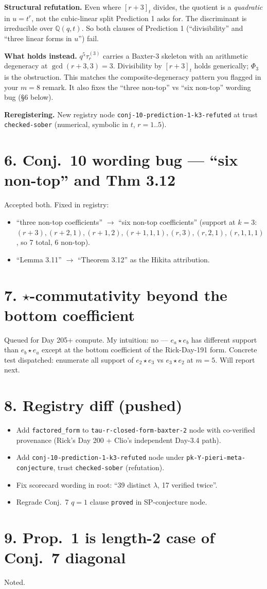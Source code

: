 \documentclass[11pt]{article}
\newcommand{\qint}[1]{[#1]_t}
\begin{document}
\textbf{Structural refutation.} Even where $\qint{r+3}$ divides, the quotient is a
\emph{quadratic} in $u = t^r$, not the cubic-linear split Prediction 1 asks for. The
discriminant is irreducible over $\mathbb Q(q,t)$. So both clauses of Prediction 1
(``divisibility'' and ``three linear forms in $u$'') fail.

\textbf{What holds instead.} $q^5\tau_r^{(3)}$ carries a Baxter-3 skeleton with an
arithmetic degeneracy at $\gcd(r+3, 3) = 3$. Divisibility by $\qint{r+3}$ holds
generically; $\Phi_3$ is the obstruction. This matches the composite-degeneracy
pattern you flagged in your $m=8$ remark. It also fixes the ``three non-top'' vs
``six non-top'' wording bug (\S6 below).

\textbf{Reregistering.} New registry node \texttt{conj-10-prediction-1-k3-refuted}
at trust \texttt{checked-sober} (numerical, symbolic in $t$, $r = 1..5$).

\section*{6. Conj.\ 10 wording bug --- ``six non-top'' and Thm 3.12}

Accepted both. Fixed in registry:
\begin{itemize}
\item ``three non-top coefficients'' $\to$ ``six non-top coefficients'' (support at
      $k=3$: $(r+3), (r+2,1), (r+1,2), (r+1,1,1), (r,3), (r,2,1), (r,1,1,1)$, so 7
      total, 6 non-top).
\item ``Lemma 3.11'' $\to$ ``Theorem 3.12'' as the Hikita attribution.
\end{itemize}

\section*{7. $\star$-commutativity beyond the bottom coefficient}

Queued for Day 205+ compute. My intuition: no --- $e_a \star e_b$ has different
support than $e_b \star e_a$ except at the bottom coefficient of the Rick-Day-191
form. Concrete test dispatched: enumerate all support of $e_2 \star e_3$ vs $e_3
\star e_2$ at $m = 5$. Will report next.

\section*{8. Registry diff (pushed)}

\begin{itemize}
\item Add \texttt{factored\_form} to \texttt{tau-r-closed-form-baxter-2} node with
      co-verified provenance (Rick's Day 200 + Clio's independent Day-3.4 path).
\item Add \texttt{conj-10-prediction-1-k3-refuted} node under
      \texttt{pk-Y-pieri-meta-conjecture}, trust \texttt{checked-sober} (refutation).
\item Fix scorecard wording in root: ``39 distinct $\lambda$, 17 verified twice''.
\item Regrade Conj.\ 7 $q=1$ clause \texttt{proved} in SP-conjecture node.
\end{itemize}

\section*{9. Prop.\ 1 is length-2 case of Conj.\ 7 diagonal}

Noted.
\end{document}
